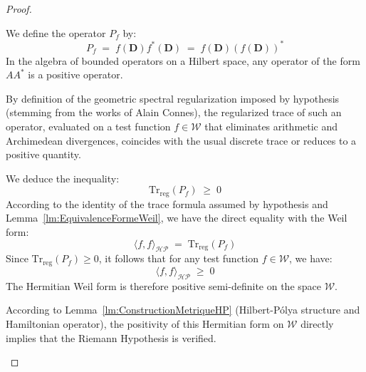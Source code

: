 \documentclass[Riemann_Hypothesis.tex]{subfiles}
\begin{document}
\begin{proof}
\begin{part_proof}
        We define the operator $P_f$ by:
        \begin{equation*}
            P_f \;=\; f(\mathbf{D}) f^*(\mathbf{D}) \;=\; f(\mathbf{D}) (f(\mathbf{D}))^*
        \end{equation*}
        In the algebra of bounded operators on a Hilbert space, any operator of the form $A A^*$ is a positive operator. \par
        By definition of the geometric spectral regularization imposed by hypothesis (stemming from the works of Alain Connes), the regularized trace of such an operator, evaluated on a test function $f \in \mathcal{W}$ that eliminates arithmetic and Archimedean divergences, coincides with the usual discrete trace or reduces to a positive quantity. \par
        We deduce the inequality:
        \begin{equation*}
            \mathrm{Tr}_{\mathrm{reg}}\left( P_f \right) \;\ge\; 0
        \end{equation*}
        According to the identity of the trace formula assumed by hypothesis 
        and Lemma~\ref{lm:EquivalenceFormeWeil}, we have the direct equality with the Weil form:
        \begin{equation*}
            \langle f, f \rangle_{\mathcal{HP}} \;=\; \mathrm{Tr}_{\mathrm{reg}}\left( P_f \right)
        \end{equation*}
        Since $\mathrm{Tr}_{\mathrm{reg}}\left( P_f \right) \ge 0$, it follows that for any test function $f \in \mathcal{W}$, we have:
        \begin{equation*}
            \langle f, f \rangle_{\mathcal{HP}} \;\ge\; 0
        \end{equation*}
        The Hermitian Weil form is therefore positive semi-definite on the space $\mathcal{W}$. \par
        According to Lemma~\ref{lm:ConstructionMetriqueHP} (Hilbert-Pólya structure and Hamiltonian operator), the positivity of this Hermitian form on $\mathcal{W}$ directly implies that the Riemann Hypothesis is verified.
    \end{part_proof}


\end{proof}
\end{document}
